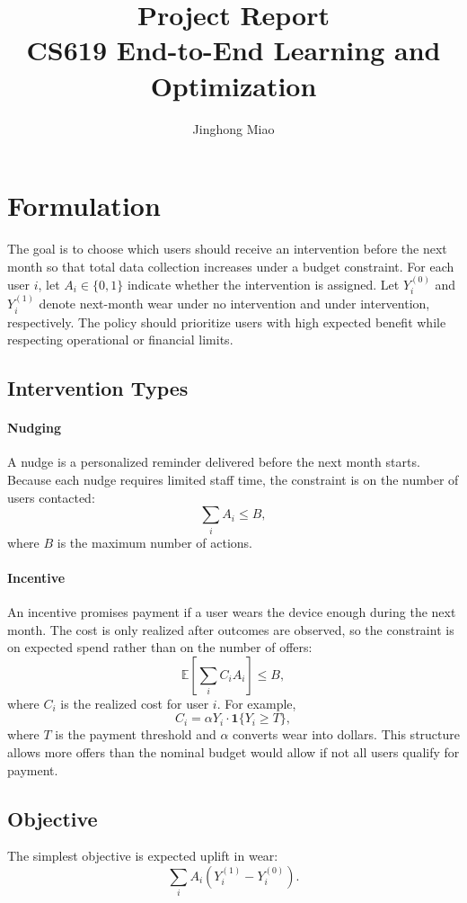 \documentclass[12pt]{article}
\title{
    \vspace{-1cm}
    \textbf{Project Report} \\
    \large CS619 End-to-End Learning and Optimization
}
\author{
    Jinghong Miao
}
\date{}
\begin{document}
\maketitle
\vspace{-0.5cm}

\section{Formulation}
The goal is to choose which users should receive an intervention before the next month so that total data collection increases under a budget constraint. For each user $i$, let $A_i \in \{0,1\}$ indicate whether the intervention is assigned. Let $Y_i^{(0)}$ and $Y_i^{(1)}$ denote next-month wear under no intervention and under intervention, respectively. The policy should prioritize users with high expected benefit while respecting operational or financial limits.

\subsection{Intervention Types}

\paragraph{Nudging}
A nudge is a personalized reminder delivered before the next month starts. Because each nudge requires limited staff time, the constraint is on the number of users contacted:
\[
\sum_i A_i \le B,
\]
where $B$ is the maximum number of actions.

\paragraph{Incentive}
An incentive promises payment if a user wears the device enough during the next month. The cost is only realized after outcomes are observed, so the constraint is on expected spend rather than on the number of offers:
\[
\mathbb{E}\left[\sum_i C_i A_i \right] \le B,
\]
where $C_i$ is the realized cost for user $i$. For example,
\[
C_i = \alpha Y_i \cdot \mathbf{1}\{Y_i \ge T\},
\]
where $T$ is the payment threshold and $\alpha$ converts wear into dollars. This structure allows more offers than the nominal budget would allow if not all users qualify for payment.

\subsection{Objective}
The simplest objective is expected uplift in wear:
\[
\sum_i A_i \left(Y^{(1)}_i - Y^{(0)}_i\right).
\]
\end{document}
